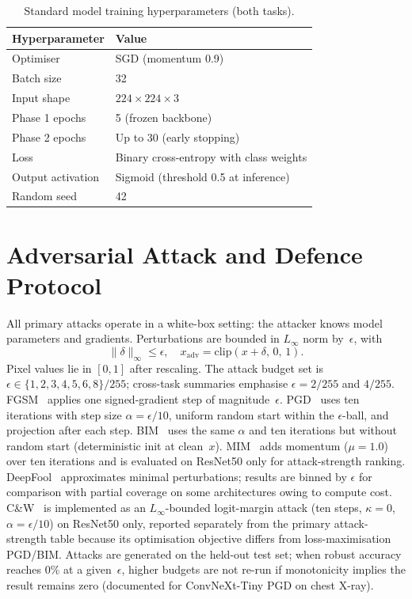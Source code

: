 \documentclass[12pt,a4paper,oneside]{report}
\begin{document}
\begin{table}[htbp]
  \centering
  \caption{Standard model training hyperparameters (both tasks).}
  \label{tab:train-hyper}
  \begin{tabular}{ll}
    \toprule
    Hyperparameter & Value \\
    \midrule
    Optimiser & SGD (momentum 0.9) \\
    Batch size & 32 \\
    Input shape & $224 \times 224 \times 3$ \\
    Phase 1 epochs & 5 (frozen backbone) \\
    Phase 2 epochs & Up to 30 (early stopping) \\
    Loss & Binary cross-entropy with class weights \\
    Output activation & Sigmoid (threshold 0.5 at inference) \\
    Random seed & 42 \\
    \bottomrule
  \end{tabular}
\end{table}

\section{Adversarial Attack and Defence Protocol}
\label{sec:methods-attacks}


All primary attacks operate in a white-box setting: the attacker knows model parameters and gradients. Perturbations are bounded in $L_\infty$ norm by~$\epsilon$, with
\[
  \|\delta\|_\infty \le \epsilon, \quad x_{\mathrm{adv}} = \mathrm{clip}(x + \delta,\, 0,\, 1).
\]
Pixel values lie in $[0,1]$ after rescaling. The attack budget set is $\epsilon \in \{1,2,3,4,5,6,8\}/255$; cross-task summaries emphasise $\epsilon = 2/255$ and $4/255$. FGSM~\cite{goodfellow2015explaining} applies one signed-gradient step of magnitude~$\epsilon$. PGD~\cite{madry2018towards} uses ten iterations with step size $\alpha = \epsilon / 10$, uniform random start within the $\epsilon$-ball, and projection after each step. BIM~\cite{kurakin2017adversarial} uses the same $\alpha$ and ten iterations but without random start (deterministic init at clean~$x$). MIM~\cite{dong2018mim} adds momentum ($\mu = 1.0$) over ten iterations and is evaluated on ResNet50 only for attack-strength ranking. DeepFool~\cite{moosavi2016deepfool} approximates minimal perturbations; results are binned by $\epsilon$ for comparison with partial coverage on some architectures owing to compute cost. C\&W~\cite{carlini2017towards} is implemented as an $L_\infty$-bounded logit-margin attack (ten steps, $\kappa = 0$, $\alpha = \epsilon/10$) on ResNet50 only, reported separately from the primary attack-strength table because its optimisation objective differs from loss-maximisation PGD/BIM. Attacks are generated on the held-out test set; when robust accuracy reaches 0\% at a given~$\epsilon$, higher budgets are not re-run if monotonicity implies the result remains zero (documented for ConvNeXt-Tiny PGD on chest X-ray).
\end{document}
